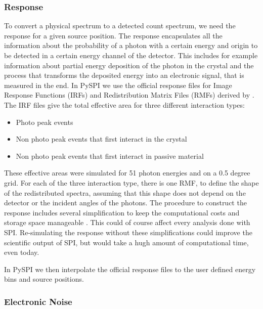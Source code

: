 \documentclass[twocolumn]{aa}
\begin{document}
\subsubsection*{Response}

To convert a physical spectrum to a detected count spectrum, we need the response for a given source position. The response encapsulates all the information about the probability of a photon with a certain energy and origin to be detected in a certain energy channel of the detector. This includes for example information about partial energy deposition of the photon in the crystal and the process that transforms the deposited energy into an electronic signal, that is measured in the end.
In PySPI we use the official response files for Image Response Functions (IRFs) and Redistribution Matrix Files (RMFs) derived by \citet{spi_response}. The IRF files give the total effective area for three different interaction types:
\begin{itemize}
  \item Photo peak events
  \item Non photo peak events that first interact in the crystal
  \item Non photo peak events that first interact in passive material
\end{itemize}

These effective areas were simulated for 51 photon energies and on a 0.5 degree grid. For each of the three interaction type, there is one RMF, to define the shape of the redistributed spectra, assuming that this shape does not depend on the detector or the incident angles of the photons. The procedure to construct the response includes several simplification to keep the computational costs and storage space manageable \citep{spi_response}. This could of course affect every analysis done with SPI. Re-simulating the response without these simplifications could improve the scientific output of SPI, but would take a hugh amount of computational time, even today.

In PySPI we then interpolate the official response files to the user defined energy bins and source positions.

\subsubsection*{Electronic Noise}
\end{document}
